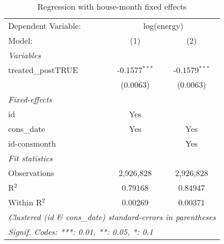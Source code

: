 
\begin{table}[htbp]
   \centering
   \caption{Regression with house-month fixed effects\label{tab:hm}}
   \begin{tabular}{lcc}
      \tabularnewline\midrule\midrule
      Dependent Variable: & \multicolumn{2}{c}{log(energy)}\\
      Model:             & (1)             & (2)\\
      \midrule \emph{Variables} &   &  \\
      treated\_postTRUE & -0.1577$^{***}$ & -0.1579$^{***}$\\
                         & (0.0063)        & (0.0063)\\
      \midrule \emph{Fixed-effects} &   &  \\
      id                 & Yes             & \\
      cons\_date        & Yes             & Yes\\
      id-consmonth       &                 & Yes\\
      \midrule \emph{Fit statistics} &   &  \\
      Observations       & 2,926,828       & 2,926,828\\
      R$^2$              & 0.79168         & 0.84947\\
      Within R$^2$       & 0.00269         & 0.00371\\
      \midrule\midrule\multicolumn{3}{l}{\emph{Clustered (id \& cons\_date) standard-errors in parentheses}}\\
      \multicolumn{3}{l}{\emph{Signif. Codes: ***: 0.01, **: 0.05, *: 0.1}}\\
   \end{tabular}
\end{table}


